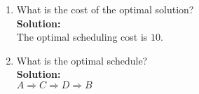 \documentclass[11pts]{article}
\begin{document}
\begin{enumerate}
  \item What is the cost of the optimal solution? \\

        \textbf{Solution:}\\
        The optimal scheduling cost is $10$. \\

  \item What is the optimal schedule? \\

        \textbf{Solution:} \\
        $A \Rightarrow C \Rightarrow D \Rightarrow B$
\end{enumerate}
\end{document}
